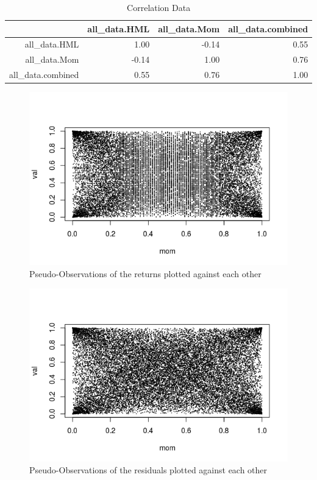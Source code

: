 \documentclass[12pt,letterpaper]{memoir}
\begin{document}
\begin{table}[ht]
\centering
\caption{Correlation Data}
\begin{tabular}{rrrr}
  \hline
 & all\_data.HML & all\_data.Mom & all\_data.combined \\ 
  \hline
all\_data.HML & 1.00 & -0.14 & 0.55 \\ 
  all\_data.Mom & -0.14 & 1.00 & 0.76 \\ 
  all\_data.combined & 0.55 & 0.76 & 1.00 \\ 
   \hline
\end{tabular}
\end{table}

\begin{figure}
\includegraphics[scale=1]{obs}
\caption{Pseudo-Observations of the returns plotted against each other}
\end{figure}
\begin{figure}
\includegraphics[scale=1]{res}
\caption{Pseudo-Observations of the residuals plotted against each other}
\end{figure}
\end{document}
